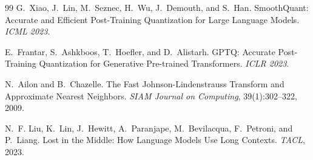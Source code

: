 \documentclass[10pt,twocolumn]{article}
\begin{document}
\begin{thebibliography}{99}
G.~Xiao, J.~Lin, M.~Seznec, H.~Wu, J.~Demouth, and S.~Han.
\newblock SmoothQuant: Accurate and Efficient Post-Training Quantization for Large Language Models.
\newblock \textit{ICML 2023}.

E.~Frantar, S.~Ashkboos, T.~Hoefler, and D.~Alistarh.
\newblock GPTQ: Accurate Post-Training Quantization for Generative Pre-trained Transformers.
\newblock \textit{ICLR 2023}.

N.~Ailon and B.~Chazelle.
\newblock The Fast Johnson-Lindenstrauss Transform and Approximate Nearest Neighbors.
\newblock \textit{SIAM Journal on Computing}, 39(1):302--322, 2009.

N.~F. Liu, K.~Lin, J.~Hewitt, A.~Paranjape, M.~Bevilacqua, F.~Petroni, and P.~Liang.
\newblock Lost in the Middle: How Language Models Use Long Contexts.
\newblock \textit{TACL}, 2023.

\end{thebibliography}
\end{document}
